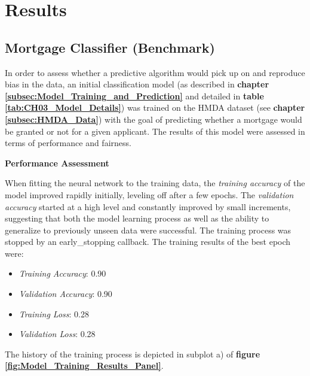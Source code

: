 \section{Results}\label{sec:Results}

\subsection{Mortgage Classifier (Benchmark)}\label{subsec:Mortgage Classifier (Benchmark) Results}

In order to assess whether a predictive algorithm would pick up on and reproduce bias in the data, an initial classification model (as described in \textbf{chapter \ref{subsec:Model_Training_and_Prediction}} and detailed in \textbf{table \ref{tab:CH03_Model_Details}}) was trained on the HMDA dataset (see \textbf{chapter \ref{subsec:HMDA_Data}}) with the goal of predicting whether a mortgage would be granted or not for a given applicant.
The results of this model were assessed in terms of performance and fairness.

\textbf{Performance Assessment}

When fitting the neural network to the training data, the \textit{training accuracy} of the model improved rapidly initially, leveling off after a few epochs. The \textit{validation accuracy} started at a high level and constantly improved by small increments, suggesting that both the model learning process as well as the ability to generalize to previously unseen data were successful. 
The training process was stopped by an early\_stopping callback. The training results of the best epoch were:
\begin{itemize}
    \item \textit{Training Accuracy}: 0.90
    \item \textit{Validation Accuracy}: 0.90
    \item \textit{Training Loss}: 0.28
    \item \textit{Validation Loss}: 0.28
\end{itemize}
The history of the training process is depicted in subplot a) of \textbf{figure \ref{fig:Model_Training_Results_Panel}}.


